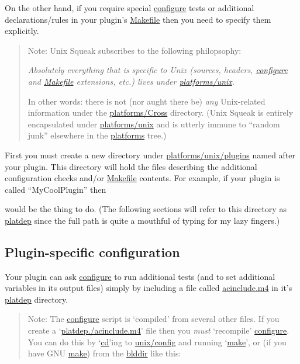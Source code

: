 \documentclass{article}
\newcommand{\cmd}{\url}
\newcommand{\cmd}{\texttt}
\newenvironment{note}{\begin{quote}\color{red} Note: }{\end{quote}}
\begin{document}
On the other hand, if you require special \cmd{configure} tests or
additional declarations/rules in your plugin's \cmd{Makefile} then you
need to specify them explicitly.

\begin{note}
Unix Squeak subscribes to the following philopsophy:

\emph{Absolutely everything that is specific
 to Unix (sources,
headers, \cmd{configure} and \cmd{Makefile} extensions, etc.) lives
under \cmd{platforms/unix}.}

In other words: there is not (nor aught there be) \emph{any}
Unix-related information under the \cmd{platforms/Cross}
directory.  (Unix Squeak is entirely encapsulated
under \cmd{platforms/unix} and is utterly immune to
``random junk'' elsewhere in the \cmd{platforms} tree.)
\end{note}

First you must create a new directory
under \cmd{platforms/unix/plugins} named after your plugin.  This directory
will hold the files describing the additional configuration checks
and/or \cmd{Makefile} contents.  For example, if your plugin is
called ``MyCoolPlugin'' then

would be the thing to do.  (The following sections will refer to this
directory as \cmd{platdep} since the full path is quite a mouthful of
typing for my lazy fingers.)


\subsection{Plugin-specific configuration}

Your plugin can ask \cmd{configure}
to run additional tests (and to
set additional variables in its output files) simply by including a
file called \cmd{acinclude.m4}
in it's \cmd{platdep} directory.

\begin{note}
The \cmd{configure}
script is `compiled' from several other files.  If
you create a `\cmd{platdep./acinclude.m4}' file then you \emph{must}
`recompile'
\cmd{configure}.  You can do this by `\cmd{cd}'ing to
\cmd{unix/config} and running `\cmd{make}', or (if you have GNU
\cmd{make}) from the \cmd{blddir} like this:
\end{note}
\end{document}
